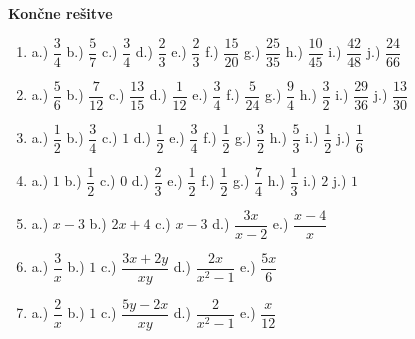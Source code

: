 \documentclass[a4paper,12pt]{letter}
\begin{document}
\vfill
\begin{center}
\end{center}

\newpage
\begin{center}
{\Large\textbf{Kon\v{c}ne re\v{s}itve}}
\end{center}
\vspace{0.3cm}

\begin{enumerate}


\item a.) $\dfrac{3}{4}$ \quad b.) $\dfrac{5}{7}$ \quad c.) $\dfrac{3}{4}$ \quad d.) $\dfrac{2}{3}$ \quad
      e.) $\dfrac{2}{3}$ \quad f.) $\dfrac{15}{20}$ \quad g.) $\dfrac{25}{35}$ \quad h.) $\dfrac{10}{45}$ \quad
      i.) $\dfrac{42}{48}$ \quad j.) $\dfrac{24}{66}$

\item a.) $\dfrac{5}{6}$ \quad b.) $\dfrac{7}{12}$ \quad c.) $\dfrac{13}{15}$ \quad d.) $\dfrac{1}{12}$ \quad
      e.) $\dfrac{3}{4}$ \quad f.) $\dfrac{5}{24}$ \quad g.) $\dfrac{9}{4}$ \quad h.) $\dfrac{3}{2}$ \quad
      i.) $\dfrac{29}{36}$ \quad j.) $\dfrac{13}{30}$

\item a.) $\dfrac{1}{2}$ \quad b.) $\dfrac{3}{4}$ \quad c.) $1$ \quad d.) $\dfrac{1}{2}$ \quad
      e.) $\dfrac{3}{4}$ \quad f.) $\dfrac{1}{2}$ \quad g.) $\dfrac{3}{2}$ \quad h.) $\dfrac{5}{3}$ \quad
      i.) $\dfrac{1}{2}$ \quad j.) $\dfrac{1}{6}$

\item a.) $1$ \quad b.) $\dfrac{1}{2}$ \quad c.) $0$ \quad d.) $\dfrac{2}{3}$ \quad e.) $\dfrac{1}{2}$ \quad
      f.) $\dfrac{1}{2}$ \quad g.) $\dfrac{7}{4}$ \quad h.) $\dfrac{1}{3}$ \quad i.) $2$ \quad j.) $1$

\item a.) $x-3$ \quad b.) $2x+4$ \quad c.) $x-3$ \quad d.) $\dfrac{3x}{x-2}$ \quad e.) $\dfrac{x-4}{x}$

\item a.) $\dfrac{3}{x}$ \quad b.) $1$ \quad c.) $\dfrac{3x+2y}{xy}$ \quad d.) $\dfrac{2x}{x^2-1}$ \quad
      e.) $\dfrac{5x}{6}$

\item a.) $\dfrac{2}{x}$ \quad b.) $1$ \quad c.) $\dfrac{5y-2x}{xy}$ \quad d.) $\dfrac{2}{x^2-1}$ \quad
      e.) $\dfrac{x}{12}$


\end{enumerate}
\end{document}
